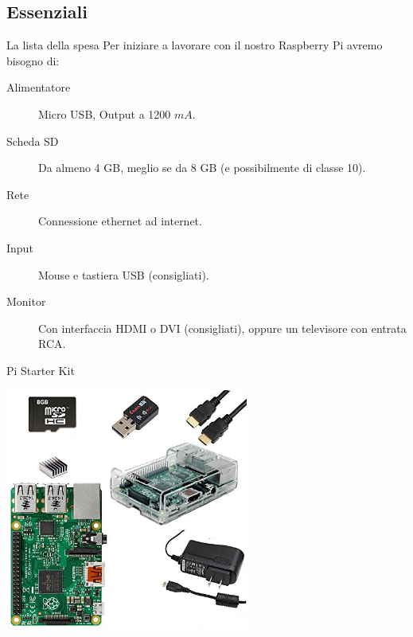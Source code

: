 \documentclass[xcolor=svgnames,11pt]{beamer}
\begin{document}
\subsection{Essenziali}
\begin{frame}{La lista della spesa}
Per iniziare a lavorare con il nostro Raspberry Pi avremo bisogno di:
\pause
\begin{description}
\item[{\color{green_raspi} Alimentatore}] Micro USB, Output a 1200 $mA$.
\pause
\item[{\color{green_raspi} Scheda SD}] Da almeno 4 GB, meglio se da 8 GB (e possibilmente di classe 10).
\pause
\item[{\color{green_raspi} Rete}] Connessione ethernet ad internet.
\pause
\item[{\color{green_raspi} Input}] Mouse e tastiera USB (consigliati).
\pause
\item[{\color{green_raspi} Monitor}] Con interfaccia HDMI o DVI (consigliati), oppure un televisore con entrata RCA.
\end{description}
\end{frame}

\begin{frame}{Pi Starter Kit}
\begin{center}
\includegraphics[width=8cm]{kit.jpg}
\end{center}
\end{frame}
\end{document}
